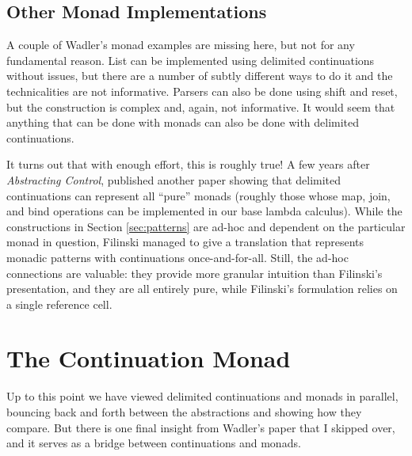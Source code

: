 \documentclass[acmsmall, nonacm, screen]{acmart}
\newcommand{\kw}[1]{\textsf{\color{ACMDarkBlue} #1}}
\begin{document}
\subsection{Other Monad Implementations}
A couple of Wadler's monad examples are missing here, but not for any fundamental reason.
\textsf{List} can be implemented using delimited continuations without issues, but there are a
number of subtly different ways to do it and the technicalities are not informative.
\textsf{Parser}s can also be done using \kw{shift} and \kw{reset}, but the construction is
complex and, again, not informative. It would seem that anything that can be done with monads can
also be done with delimited continuations.

It turns out that with enough effort, this is roughly true! A few years after {\em Abstracting
Control}, \citet{filinski1994representing} published another paper showing that delimited
continuations can represent all ``pure'' monads (roughly those whose \textsf{map}, \textsf{join},
and \textsf{bind} operations can be implemented in our base lambda calculus). While the
constructions in Section \ref{sec:patterns} are ad-hoc and dependent on the particular monad in
question, Filinski managed to give a translation that represents monadic patterns with
continuations once-and-for-all. Still, the ad-hoc connections are valuable: they provide more
granular intuition than Filinski's presentation, and they are all entirely pure, while Filinski's
formulation relies on a single reference cell.

\section{The Continuation Monad} \label{sec:contmonad}

Up to this point we have viewed delimited continuations and monads in parallel, bouncing back and
forth between the abstractions and showing how they compare. But there is one final insight from
Wadler's paper that I skipped over, and it serves as a bridge between continuations and monads.
\end{document}
